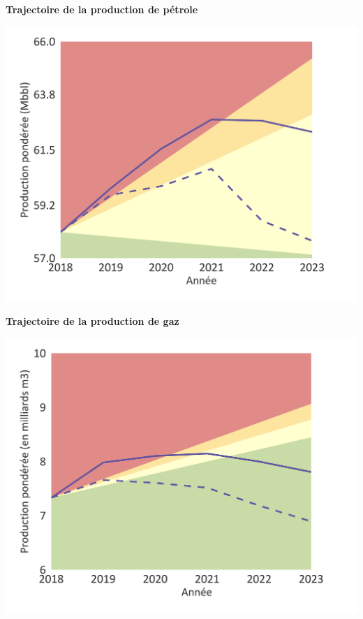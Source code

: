 \documentclass[10pt,table,a4]{article}\usepackage[]{graphicx}\usepackage[]{color}
\begin{document}
	
	\begin{minipage}[t]{.49\linewidth}
		\begin{center}
		\textbf{Trajectoire de la production de pétrole }
	   \end{center}
		\includegraphics[trim = {0 0cm 0 0},width=1\linewidth]{ReportOutputs/Fig11}
		
	\end{minipage}	
	\hspace{.02\linewidth}
	\begin{minipage}[t]{.49\textwidth}
		\begin{center}
		\textbf{Trajectoire de la production de gaz }
	   \end{center}
		\includegraphics[trim = {0 0cm 0 0},width=1\linewidth]{ReportOutputs/Fig12}
		
	\end{minipage}
	
\end{document}
